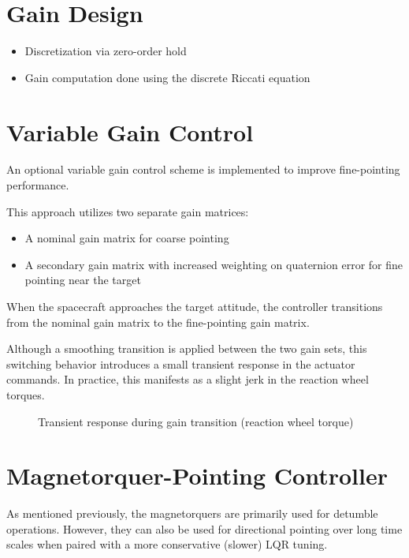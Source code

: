 \section{Gain Design}

\begin{itemize}
	\item Discretization via zero-order hold
	\item Gain computation done using the discrete Riccati equation
\end{itemize}

\section{Variable Gain Control}

An optional variable gain control scheme is implemented to improve fine-pointing performance.

This approach utilizes two separate gain matrices:

\begin{itemize}
	\item A nominal gain matrix for coarse pointing
	\item A secondary gain matrix with increased weighting on quaternion error for fine pointing near the target
\end{itemize}

When the spacecraft approaches the target attitude, the controller transitions from the nominal gain matrix to the fine-pointing gain matrix.

Although a smoothing transition is applied between the two gain sets, this switching behavior introduces a small transient response in the actuator commands. In practice, this manifests as a slight jerk in the reaction wheel torques.

\begin{figure}[h]
	\centering
	\caption{Transient response during gain transition (reaction wheel torque)}
\end{figure}

\section{Magnetorquer-Pointing Controller}

As mentioned previously, the magnetorquers are primarily used for detumble operations. However, they can also be used for directional pointing over long time scales when paired with a more conservative (slower) LQR tuning.

